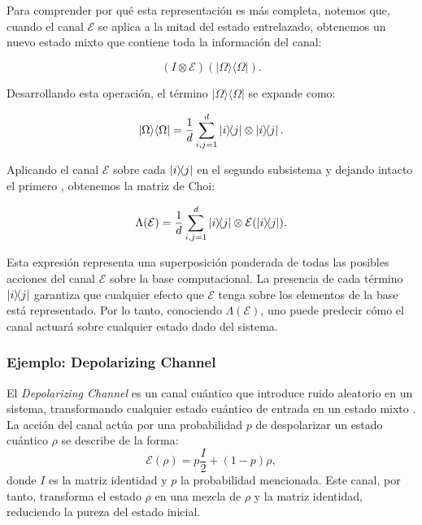 \documentclass[11pt, spanish, letterpage]{report} %
\newcommand{\1}{\mathbb{1}}
\begin{document}
Para comprender por qué esta representación es más completa, notemos que, cuando el canal $\mathcal{E}$ se aplica a la mitad del estado entrelazado, obtenemos un nuevo estado mixto que contiene toda la información del canal:

\begin{equation}
(I \otimes \mathcal{E})(|\Omega\rangle\langle\Omega|).
\end{equation}

Desarrollando esta operación, el término $|\Omega\rangle\langle\Omega|$ se expande como:

\begin{equation}
|\Omega\rangle\langle\Omega| = \frac{1}{d} \sum_{i,j=1}^{d} \ketbra{i}{j} \otimes \ketbra{i}{j}.
\end{equation}

Aplicando el canal $\mathcal{E}$ sobre cada $\ketbra{i}{j}$ en el segundo subsistema y dejando intacto el primero , obtenemos la matriz de Choi:

\begin{equation}\label{ec:1.7}
\Lambda(\mathcal{E}) = \frac{1}{d} \sum_{i,j=1}^{d} \ketbra{i}{j} \otimes \mathcal{E}(\ketbra{i}{j}).
\end{equation}

Esta expresión representa una superposición ponderada de todas las posibles acciones del canal $\mathcal{E}$ sobre la base computacional. La presencia de cada término $\ketbra{i}{j}$ garantiza que cualquier efecto que $\mathcal{E}$ tenga sobre los elementos de la base está representado. Por lo tanto, conociendo $\Lambda(\mathcal{E})$, uno puede predecir cómo el canal actuará sobre cualquier estado dado del sistema.

\subsubsection{Ejemplo: Depolarizing Channel}

El \textit{Depolarizing Channel} es un canal cuántico que introduce ruido aleatorio en un sistema, transformando cualquier estado cuántico de entrada en un estado mixto \cite{nielsen_chuang_2011}. La acción del canal actúa por una probabilidad $p$ de despolarizar un estado cuántico $\rho$ se describe de la forma:
\begin{equation}
\mathcal{E}(\rho) = p \frac{I}{2} + (1 - p)\rho ,
\end{equation}
donde $I$ es la matriz identidad y $p$ la probabilidad mencionada. Este canal, por tanto, transforma el estado $\rho$ en una mezcla de $\rho$ y la matriz identidad, reduciendo la pureza del estado inicial.
\end{document}
